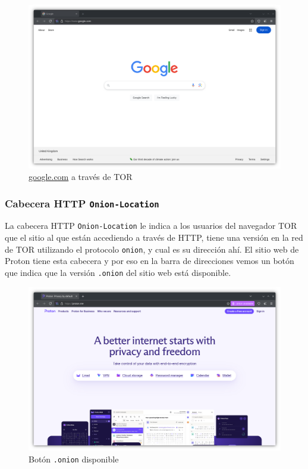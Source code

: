 \begin{figure}[H]
    \centering
    \includegraphics[width=\textwidth]{tor-google.png}
    \caption{\url{google.com} a través de TOR}
\end{figure}

\subsubsection{Cabecera HTTP \texttt{Onion-Location}}

La cabecera HTTP \texttt{Onion-Location} le indica a los usuarios del navegador TOR que el sitio al que están accediendo a través de HTTP, tiene una versión en la red de TOR utilizando el protocolo \texttt{onion}, y cual es su dirección ahí. El sitio web de Proton tiene esta cabecera y por eso en la barra de direcciones vemos un botón que indica que la versión \texttt{.onion} del sitio web está disponible.

\begin{figure}[H]
    \centering
    \includegraphics[width=\textwidth]{proton.me-.onion-popup.png}
    \caption{Botón \texttt{.onion} disponible}
\end{figure}

